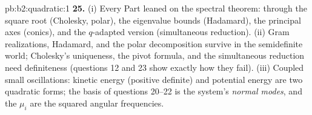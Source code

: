 \begin{solution}{pb:b2:quadratic:1}
\textbf{25.} (i) Every Part leaned on the spectral theorem:
through the square root (Cholesky, polar), the eigenvalue
bounds (Hadamard), the principal axes (conics), and the
$q$-adapted version (simultaneous reduction). (ii) Gram
realizations, Hadamard, and the polar decomposition survive in
the semidefinite world; Cholesky's uniqueness, the pivot
formula, and the simultaneous reduction need definiteness
(questions 12 and 23 show exactly how they fail). (iii)
Coupled small oscillations: kinetic energy (positive definite)
and potential energy are two quadratic forms; the basis of
questions 20--22 is the system's \emph{normal modes}, and the
$\mu_i$ are the squared angular frequencies.
\end{solution}
